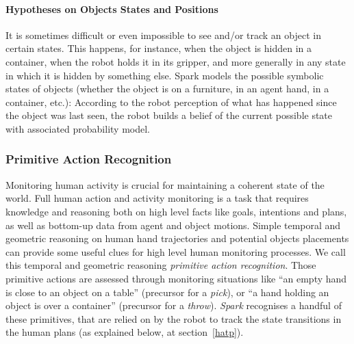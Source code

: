 \documentclass[preprint,3p,times]{elsarticle}
\newcommand{\ie}{{\textit{i.e.\ }}}
\begin{document}
\paragraph{Hypotheses on Objects States and Positions}

It is sometimes difficult or even impossible to see and/or track an object in
certain states. This happens, for instance, when the object is hidden in a
container, when the robot holds it in its gripper, and more generally in any
state in which it is hidden by something else. {\sc Spark} models the possible
symbolic states of objects (whether the object is on a furniture, in an agent
hand, in a container, etc.): According to the robot perception of what has
happened since the object was last seen, the robot builds a belief of the
current possible state with associated probability model.

\subsubsection{Primitive Action Recognition}

Monitoring human activity is crucial for maintaining a coherent state of the
world. Full human action and activity monitoring is a task that requires
knowledge and reasoning both on high level facts like goals, intentions and
plans, as well as bottom-up data from agent and object motions. Simple temporal
and geometric reasoning on human hand trajectories and potential objects
placements can provide some useful clues for high level human monitoring
processes. We call this temporal and geometric reasoning \emph{primitive action
recognition}. Those primitive actions are assessed through monitoring situations
like ``an empty hand is close to an object on a table'' (precursor for a
\emph{pick}), or ``a hand holding an object is over a container'' (precursor for
a \emph{throw}). \emph{Spark} recognises a handful  of these
primitives, that are relied on by the robot to track the state transitions in
the human plans (as explained below, at section~\ref{hatp}).

%
%
%
\end{document}

